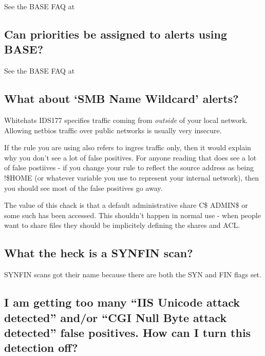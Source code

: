 \documentclass{article}
\begin{document}
See the BASE FAQ at 

\subsection{Can priorities be assigned to alerts using BASE?  }

See the BASE FAQ at 

\subsection{What about `SMB Name Wildcard' alerts? }

Whitehats IDS177
specifies traffic coming from {\em outside} of your local network.  Allowing
netbios traffic over public networks is usually very insecure.

If the rule you are using also refers to ingres traffic only, then it
would explain why you don't see a lot of false positives.  For anyone
reading that does see a lot of false postiives -  if you change your rule
to reflect the source address as being !\$HOME (or whatever variable you
use to represent your internal network), then you should see most of the
false positives go away.

The value of this chack is that a default administrative share C\$ ADMIN\$ or
some such has been accessed.  This shouldn't happen in normal use - when
people want to share files they should be implicitely defining the shares
and ACL.  

\subsection{What the heck is a SYNFIN scan? }

SYNFIN scans got their name because there are both the SYN and FIN flags set. 

\subsection{I am getting too many ``IIS Unicode attack detected'' and/or ``CGI Null Byte attack detected'' false positives.  How can I turn this detection off? }
\end{document}
